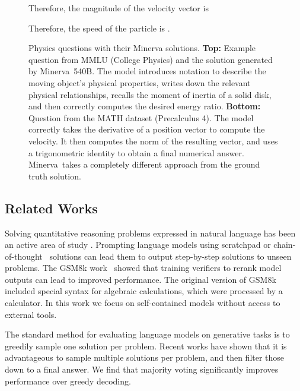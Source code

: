 \documentclass{article}
\newcommand{\ourmodel}[0]{{Minerva~}}
\begin{document}
\begin{figure}
\begin{tcolorbox}[colback=blue!5!white,colframe=blue!75!black]
\begin{small}
Therefore, the magnitude of the velocity vector is

Therefore, the speed of the particle is .

\end{small}
\end{tcolorbox}

\caption{\small Physics questions with their Minerva solutions. \textbf{Top:} Example question from MMLU (College Physics) and the solution generated by \ourmodel 540B. The model introduces notation to describe the moving object's physical properties, writes down the relevant physical relationships, recalls the moment of inertia of a solid disk, and then correctly computes the desired energy ratio.
\textbf{Bottom:} 
Question from the MATH dataset (Precalculus 4). The model correctly takes the derivative of a position vector to compute the velocity. It then computes the norm of the resulting vector, and uses a trigonometric identity to obtain a final numerical answer. \ourmodel takes a completely different approach from the ground truth solution.
}
\label{fig:example_particle}
\end{figure}



\subsection{Related Works}

Solving quantitative reasoning problems expressed in natural language has been an active area of study \citep{parsing_algebraic,learning_to_solve_arithmetic}. 
Prompting language models using scratchpad \cite{scratchpad} or chain-of-thought~\cite{chain_of_thought} solutions can lead them to output step-by-step  solutions to unseen problems. The GSM8k work~\cite{gsm8k} showed that training verifiers to rerank model outputs can lead to improved performance. The original version of GSM8k included special syntax for algebraic calculations, which were processed by a calculator. In this work we focus on self-contained models without access to external tools.

The standard method for evaluating language models on generative tasks is to greedily sample one solution per problem.
Recent works \citep{codex,alphacode,lamda,majority_voting} have shown that it is advantageous to sample multiple solutions per problem, and then filter those down to a final answer.
We find that majority voting \citep{majority_voting} significantly improves performance over greedy decoding. 
\end{document}
